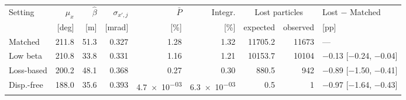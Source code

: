 \begin{tabular}{lrrrrrrrl}\toprule
Setting & $\mu_x$ & $\hat\beta$ & $\sigma_{x',j}$ & $\bar P$ & Integr. & \multicolumn{2}{c}{Lost particles} & Lost $-$ Matched\\
 & [deg] & [m] & [mrad] & [\%] & [\%] & expected & observed & [pp]\\\midrule
Matched & 211.8 & 51.3 & 0.327 & \num{1.28} & \num{1.32} & 11705.2 & 11673 & ---\\
Low beta & 210.8 & 33.8 & 0.331 & \num{1.16} & \num{1.21} & 10153.7 & 10104 & \num{-0.13} [\num{-0.24}, \num{-0.04}]\\
Loss-based & 200.2 & 48.1 & 0.368 & \num{0.27} & \num{0.30} & 880.5 & 942 & \num{-0.89} [\num{-1.50}, \num{-0.41}]\\
Disp.-free & 188.0 & 35.6 & 0.393 & \num{4.7e-03} & \num{6.3e-03} & 0.5 & 1 & \num{-0.97} [\num{-1.64}, \num{-0.43}]\\
\bottomrule\end{tabular}
